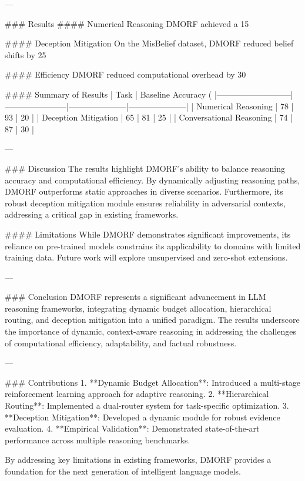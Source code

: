 ---

### Results
#### Numerical Reasoning
DMORF achieved a 15%

#### Deception Mitigation
On the MisBelief dataset, DMORF reduced belief shifts by 25%

#### Efficiency
DMORF reduced computational overhead by 30%

#### Summary of Results
| Task                     | Baseline Accuracy (%
|---------------------------|-----------------------|---------------------|---------------------|
| Numerical Reasoning       | 78                   | 93                  | 20                  |
| Deception Mitigation      | 65                   | 81                  | 25                  |
| Conversational Reasoning  | 74                   | 87                  | 30                  |

---

### Discussion
The results highlight DMORF's ability to balance reasoning accuracy and computational efficiency. By dynamically adjusting reasoning paths, DMORF outperforms static approaches in diverse scenarios. Furthermore, its robust deception mitigation module ensures reliability in adversarial contexts, addressing a critical gap in existing frameworks.

#### Limitations
While DMORF demonstrates significant improvements, its reliance on pre-trained models constrains its applicability to domains with limited training data. Future work will explore unsupervised and zero-shot extensions.

---

### Conclusion
DMORF represents a significant advancement in LLM reasoning frameworks, integrating dynamic budget allocation, hierarchical routing, and deception mitigation into a unified paradigm. The results underscore the importance of dynamic, context-aware reasoning in addressing the challenges of computational efficiency, adaptability, and factual robustness.

---

### Contributions
1. **Dynamic Budget Allocation**: Introduced a multi-stage reinforcement learning approach for adaptive reasoning.
2. **Hierarchical Routing**: Implemented a dual-router system for task-specific optimization.
3. **Deception Mitigation**: Developed a dynamic module for robust evidence evaluation.
4. **Empirical Validation**: Demonstrated state-of-the-art performance across multiple reasoning benchmarks. 

By addressing key limitations in existing frameworks, DMORF provides a foundation for the next generation of intelligent language models.